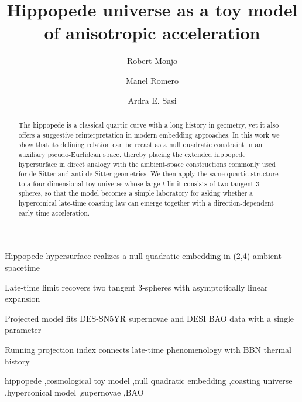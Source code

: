 \documentclass[preprint,12pt]{elsarticle}
\begin{document}
\begin{frontmatter}

\title{Hippopede universe as a toy model of anisotropic acceleration}

\author[cunef,chile]{Robert Monjo}
\author[barcelona]{Manel Romero}
\author[mgU]{Ardra E. Sasi}

\address[cunef]{Department of Mathematics, CUNEF Universidad, Calle Almansa 101, Madrid 28040, Spain}
\address[chile]{Centro de Estudios Cosmologicos ``Prof. Jaime Roessler Bonzi'', Facultad de Ciencias, Universidad de Chile, Las Palmeras 3425, \~Nunoa, Santiago 7750000, Chile}
\address[barcelona]{Area of Chemistry, University of Barcelona, Campus Diagonal: Av. Joan XXIII, 27-31, 08028 Barcelona, Spain}
\address[mgU]{School of Pure and Applied Physics, Mahatma Gandhi University, Priyadarsini Hills P.O. Athirampuzha, Kottayam, Kerala 686560, India}

\begin{abstract}
The hippopede is a classical quartic curve with a long history in geometry, yet it also offers a suggestive reinterpretation in modern embedding approaches. In this work we show that its defining relation can be recast as a null quadratic constraint in an auxiliary pseudo-Euclidean space, thereby placing the extended hippopede hypersurface in direct analogy with the ambient-space constructions commonly used for de Sitter and anti de Sitter geometries. We then apply the same quartic structure to a four-dimensional toy universe whose large-$t$ limit consists of two tangent $3$-spheres, so that the model becomes a simple laboratory for asking whether a hyperconical late-time coasting law can emerge together with a direction-dependent early-time acceleration.
\end{abstract}

\begin{highlights}
\item Hippopede hypersurface realizes a null quadratic embedding in (2,4) ambient spacetime
\item Late-time limit recovers two tangent 3-spheres with asymptotically linear expansion
\item Projected model fits DES-SN5YR supernovae and DESI BAO data with a single parameter
\item Running projection index connects late-time phenomenology with BBN thermal history
\end{highlights}

\begin{keyword}
hippopede \sep cosmological toy model \sep null quadratic embedding \sep coasting universe \sep hyperconical model \sep supernovae \sep BAO
\end{keyword}

\end{frontmatter}
\end{document}
